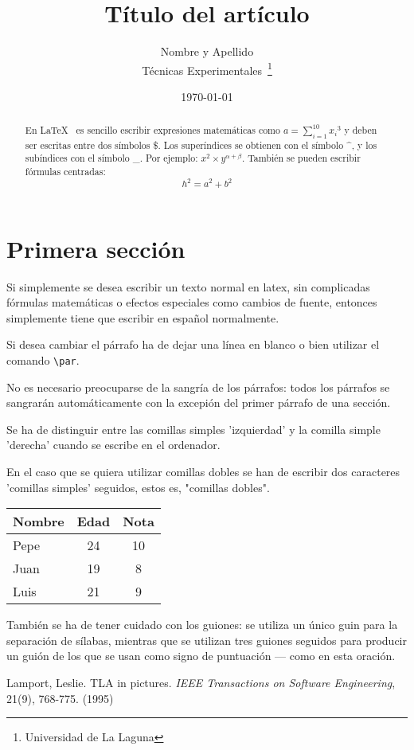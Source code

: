\documentclass[a4paper,12pt]{article}
\begin{document}
\title{Título del artículo}
  \author{Nombre y Apellido \\
          Técnicas Experimentales~\footnote{Universidad de La Laguna}
         }
  \date{\today}
  \maketitle
   \begin{abstract}
     En \LaTeX{}~\cite{Lam:86} es sencillo escribir expresiones
     matemáticas como $a=\sum_{i=1}^{10} {x_i}^{3}$
     y deben ser escritas entre dos símbolos \$.
     Los superíndices se obtienen con el símbolo \^{}, y
     los subíndices con el símbolo \_.
     Por ejemplo: $x^2 \times y^{\alpha + \beta}$.
     También se pueden escribir f\'ormulas centradas:
   \[h^2=a^2 + b^2 \]
 \end{abstract}
 \section{Primera sección}
Si simplemente se desea escribir un texto normal en latex,
sin complicadas f\'ormulas matem\'aticas o efectos especiales
como cambios  de fuente, entonces simplemente tiene que escribir
en espa\~nol normalmente.
\par
Si desea cambiar el p\'arrafo ha de dejar una l\'inea en blanco o bien
utilizar el comando \verb|\par|.

No es necesario preocuparse de la sangr\'ia de los p\'arrafos:
todos los p\'arrafos se sangrar\'an autom\'aticamente con la excepi\'on
del primer p\'arrafo de una secci\'on.

Se ha de distinguir entre las comillas simples 'izquierdad' 
y la comilla simple 'derecha' cuando se escribe en el ordenador.

En el caso que se quiera utilizar comillas dobles se han de
escribir dos caracteres 'comillas simples' seguidos, estos es,
"comillas dobles".

\bigskip
  \begin{tabular}{|l|c|c|}
   \hline
   Nombre & Edad & Nota \\ \hline
   Pepe & 24 & 10 \\ \hline
   Juan & 19 & 8 \\ \hline
   Luis & 21 & 9 \\ \hline
   \end{tabular}
Tambi\'en se ha de tener cuidado con los guiones: se utiliza un \'unico
guin para la separaci\'on de s\'ilabas, mientras que se utilizan 
tres  guiones seguidos para producir un gui\'on de los que se usan
como signo de puntuaci\'on --- como en esta oraci\'on.
\begin{thebibliography}{00}
      Lamport, Leslie.
      TLA in pictures.
      \emph{IEEE Transactions on Software Engineering},
      21(9), 768-775.
      (1995)
\end{thebibliography}
\end{document}
